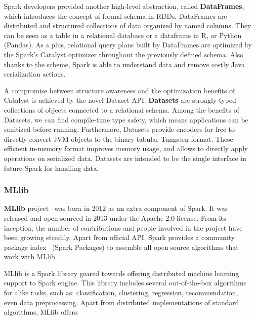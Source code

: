 \documentclass[3p,review]{elsarticle}
\begin{document}
Spark developers provided another high-level abstraction, called \textbf{DataFrames}, which introduces the concept of formal schema in RDDs. DataFrames are distributed and structured collections of data organized by named columns. They can be seen as a table in a relational database or a dataframe in R, or Python (Pandas). As a plus, relational query plans built by DataFrames are optimized by the Spark's Catalyst optimizer throughout the previously defined schema. Also thanks to the scheme, Spark is able to understand data and remove costly Java serialization actions.

A compromise between structure awareness and the optimization benefits of Catalyst is achieved by the novel Dataset API. \textbf{Datasets} are strongly typed collections of objects connected to a relational schema. Among the benefits of Datasets, we can find compile-time type safety, which means applications can be sanitized before running. Furthermore, Datasets provide encoders for free to directly convert JVM objects to the binary tabular Tungsten format. These efficient in-memory format improves memory usage, and allows to directly apply operations on serialized data. Datasets are intended to be the single interface in future Spark for handling data.

\subsubsection{MLlib}


\textbf{MLlib} project~\cite{mllib15} was born in 2012 as an extra component of Spark. It was released and open-sourced in 2013 under the Apache 2.0 license. From its inception, the number of contributions and people involved in the project have been growing steadily. Apart from official API, Spark provides a community package index~\cite{sparkpackages} (Spark Packages) to assemble all open source algorithms that work with MLlib. 

MLlib is a Spark library geared towards offering distributed machine learning support to Spark engine. This library includes several out-of-the-box algorithms for alike tasks, such as: classification, clustering, regression, recommendation, even data preprocessing. Apart from distributed implementations of standard algorithms, MLlib offers:
\end{document}
